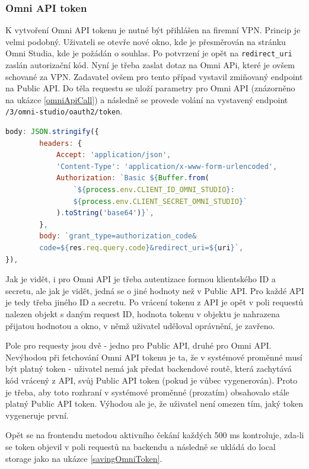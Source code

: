 \documentclass[czech, bc, kiv, he, iso690numb]{fasthesis}
\begin{document}
\subsubsection{Omni API token}
K vytvoření Omni API tokenu je nutné být přihlášen na firemní VPN. Princip je velmi podobný. Uživateli se otevře nové okno, kde je přesměrován na stránku Omni Studia, kde je požádán
o souhlas. Po potvrzení je opět na \texttt{redirect\_uri} zaslán autorizační kód. Nyní je třeba zaslat dotaz na Omni APi, které je ovšem schované za VPN. Zadavatel ovšem pro tento případ
vystavil zmiňovaný endpoint na Public API. Do těla requestu se uloží parametry pro Omni API (znázorněno na ukázce \ref{omniApiCall}) a následně se provede volání na vystavený endpoint
\texttt{/3/omni-studio/oauth2/token}. 

\begin{lstlisting}[language=Javascript, caption={Parametry pro Omni API}, label=omniApiCall]
body: JSON.stringify({
		headers: {
			Accept: 'application/json',
			'Content-Type': 'application/x-www-form-urlencoded',
			Authorization: `Basic ${Buffer.from(
				`${process.env.CLIENT_ID_OMNI_STUDIO}:
				${process.env.CLIENT_SECRET_OMNI_STUDIO}`
			).toString('base64')}`,
		},
		body: `grant_type=authorization_code&
		code=${res.req.query.code}&redirect_uri=${uri}`,
}),
\end{lstlisting}

Jak je vidět, i pro Omni API je třeba autentizace formou klientského ID a secretu, ale jak je vidět, jedná se o jiné hodnoty než v Public API. Pro každé API
je tedy třeba jiného ID a secretu. Po vrácení tokenu z API je opět v poli requestů nalezen objekt s daným request ID, hodnota tokenu v objektu je nahrazena přijatou hodnotou a okno, v němž
uživatel uděloval oprávnění, je zavřeno. 

Pole pro requesty jsou dvě - jedno pro Public API, druhé pro Omni API. Nevýhodou při fetchování Omni API tokenu je ta, že v systémové proměnné musí být platný token - uživatel nemá jak předat
backendové routě, která zachytává kód vrácený z API, svůj Public API token (pokud je vůbec vygenerován). Proto je třeba, aby toto rozhraní v systémové proměnné (prozatím) obsahovalo stále platný 
Public API token. Výhodou ale je, že uživatel není omezen tím, jaký token vygeneruje první.

Opět se na frontendu metodou aktivního čekání každých 500 ms kontroluje, zda-li se token objevil v poli requestů na backendu a následně se ukládá do local storage jako na ukázce
\ref{savingOmniToken}.
\end{document}
